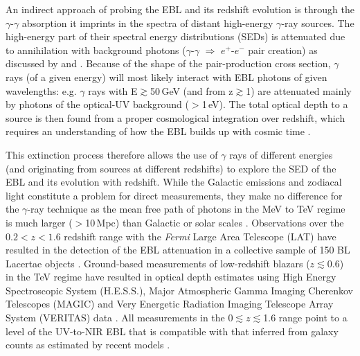 \documentclass[12pt,preprint]{aastex}
\begin{document}
An  indirect approach of probing the EBL and its redshift evolution
is through the $\gamma$-$\gamma$ absorption {it imprints in the spectra of
distant high-energy $\gamma$-ray sources}. The high-energy part of their spectral energy distributions (SEDs) {is 
attenuated} due to annihilation with background photons ($\gamma$-$\gamma$ $\Rightarrow$ $e^+$-$e^-$ pair creation) {as
discussed by \cite{nikishov61} and \cite{Gould67_2, Gould67}.}
Because of the shape of the pair-production cross section,
$\gamma$ rays (of a given energy) will most likely interact
with EBL photons of given wavelengths: e.g. 
 $\gamma$ rays with  E$\gtrsim$50\,GeV (and from z$\gtrsim$1) are attenuated mainly by photons of the optical-UV background ($>$1\,eV). The total optical depth to a source is then found from a proper  cosmological integration over redshift, which requires an understanding of how the
EBL builds up with cosmic time {\citep{dwek13}.}

This extinction process therefore allows the use of $\gamma$ rays of different energies (and originating
from sources at different redshifts) 
to explore the SED of the EBL and its evolution with redshift.
While the Galactic emissions and zodiacal light constitute a problem for 
direct measurements, they make no difference for the $\gamma$-ray technique as the
mean free path of photons in the MeV to TeV regime is much larger ($>$10\,Mpc) than Galactic or
solar scales \citep{adams}.
%
Observations {over the $0.2<z<1.6$ redshift range} with the {\it Fermi} Large Area Telescope (LAT) have resulted in the detection 
of the EBL attenuation
in a collective sample of 150 BL Lacertae
objects \citep[BL Lacs, see][]{ebl12}.
Ground-based measurements of low-redshift blazars ($z\lesssim$0.6) in the TeV regime have resulted in
optical depth estimates using High Energy Spectroscopic System (H.E.S.S.), Major Atmospheric Gamma
Imaging Cherenkov Telescopes (MAGIC) and Very Energetic Radiation Imaging Telescope Array System
(VERITAS) data \citep[e.g.][]{hess_ebl12,dominguez13a,biteau2015}.
All measurements in the 0$\lesssim$$z$$\lesssim$1.6 range point to a level of the UV-to-NIR EBL 
that is compatible with that inferred from galaxy counts as estimated by recent
models \citep[e.g.][]{franceschini08,finke10,dominguez11,
stecker12,helgason12,stecker16}.
\end{document}
